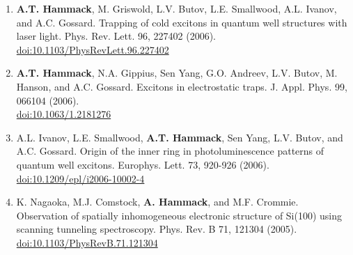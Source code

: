{\begin{enumerate}[resume]
{        }
        \item {
        \textbf{A.T. Hammack}, M. Griswold, L.V. Butov, L.E. Smallwood, A.L. Ivanov, and A.C. Gossard.
        Trapping of cold excitons in quantum well structures with laser light.
        Phys. Rev. Lett. 96, 227402 (2006).
        \\ \href{https://doi.org/10.1103/PhysRevLett.96.227402}{doi:10.1103/PhysRevLett.96.227402}
        }
        \item {
        \textbf{A.T. Hammack}, N.A. Gippius, Sen Yang, G.O. Andreev, L.V. Butov, M. Hanson, and A.C. Gossard.
        Excitons in electrostatic traps.
        J. Appl. Phys. 99, 066104 (2006).
        \\ \href{https://doi.org/10.1063/1.2181276}{doi:10.1063/1.2181276}
        }
        \item {
        A.L. Ivanov, L.E. Smallwood, \textbf{A.T. Hammack}, Sen Yang, L.V. Butov, and A.C. Gossard.
        Origin of the inner ring in photoluminescence patterns of quantum well excitons.
        Europhys. Lett. 73, 920-926 (2006).
        \\ \href{https://doi.org/10.1209/epl/i2006-10002-4}{doi:10.1209/epl/i2006-10002-4}
        }
        \item {
        K. Nagaoka, M.J. Comstock, \textbf{A. Hammack}, and M.F. Crommie.
        Observation of spatially inhomogeneous electronic structure of Si(100) using scanning tunneling spectroscopy.
        Phys. Rev. B 71, 121304 (2005).
        \\ \href{https://doi.org/10.1103/PhysRevB.71.121304}{doi:10.1103/PhysRevB.71.121304}
        }
        \setcounter{pubs}{\value{enumi}}
    \end{enumerate}
}
